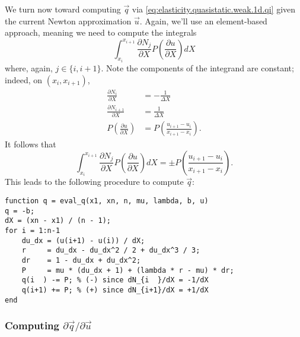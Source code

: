 We turn now toward computing $\vec{q}$ via \eqref{eq:elasticity.quasistatic.weak.1d.qi} given the current Newton approximation $\vec{u}$. Again, we'll use an element-based approach, meaning we need to compute the integrals
\begin{equation*}
\int_{x_i}^{x_{i+1}} \frac{\partial N_j}{\partial X} P \left( \frac{\partial u}{\partial X} \right) dX
\end{equation*}
where, again, $j \in \{i, i+1\}$. Note the components of the integrand are constant; indeed, on $\left( x_i, x_{i+1} \right)$,
\begin{align*}
\frac{\partial N_i}{\partial X} & = -\frac{1}{\Delta X} \\
\frac{\partial N_{i+1}}{\partial X} & = \frac{1}{\Delta X} \\
P \left( \frac{\partial u}{\partial X} \right) & = P \left( \frac{u_{i+1} - u_i}{x_{i+1} - x_i} \right).
\end{align*}
It follows that
\begin{equation*}
\int_{x_i}^{x_{i+1}} \frac{\partial N_j}{\partial X} P \left( \frac{\partial u}{\partial X} \right) dX = \pm P \left( \frac{u_{i+1} - u_i}{x_{i+1} - x_i} \right).
\end{equation*}
This leads to the following procedure to compute $\vec{q}$:
\begin{verbatim}
function q = eval_q(x1, xn, n, mu, lambda, b, u)
q = -b;
dX = (xn - x1) / (n - 1);
for i = 1:n-1
    du_dx = (u(i+1) - u(i)) / dX;
    r     = du_dx - du_dx^2 / 2 + du_dx^3 / 3;
    dr    = 1 - du_dx + du_dx^2;
    P     = mu * (du_dx + 1) + (lambda * r - mu) * dr;
    q(i  ) -= P; % (-) since dN_{i  }/dX = -1/dX
    q(i+1) += P; % (+) since dN_{i+1}/dX = +1/dX
end
\end{verbatim}

\subsubsection{Computing $\partial\vec{q}/\partial\vec{u}$}

